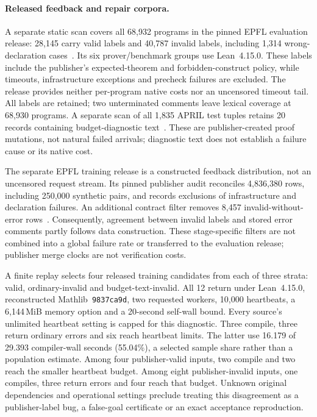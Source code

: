 \documentclass[10pt,twocolumn]{article}
\begin{document}
\paragraph{Released feedback and repair corpora.}
A separate static scan covers all 68,932 programs in the pinned EPFL
evaluation release: 28,145 carry valid labels and 40,787 invalid labels,
including 1,314 wrong-declaration cases~\cite{epflEvaluation}.
Its six prover/benchmark groups use Lean~4.15.0. These labels include the
publisher's expected-theorem and forbidden-construct policy, while timeouts,
infrastructure exceptions and precheck failures are excluded. The release
provides neither per-program native costs nor an uncensored timeout tail.
All labels are retained; two unterminated comments leave lexical coverage
at 68,930 programs. A separate scan of all 1,835 APRIL test tuples retains
20 records containing budget-diagnostic text~\cite{aprilDataset}.
These are publisher-created proof mutations, not natural failed arrivals;
diagnostic text does not establish a failure cause or its native cost.

The separate EPFL training release is a constructed feedback distribution,
not an uncensored request stream. Its pinned publisher audit reconciles
4,836,380 rows, including 250,000 synthetic pairs, and records exclusions
of infrastructure and declaration failures. An additional contract filter
removes 8,457 invalid-without-error rows~\cite{epflTrainingAudit}.
Consequently, agreement between invalid labels and stored error comments
partly follows data construction. These stage-specific filters are not
combined into a global failure rate or transferred to the evaluation release;
publisher merge clocks are not verification costs.

A finite replay selects four released training candidates from each of three
strata: valid, ordinary-invalid and budget-text-invalid. All 12 return under
Lean~4.15.0, reconstructed Mathlib~\texttt{9837ca9d}, two requested workers,
10,000 heartbeats, a 6,144\,MiB memory option and a 20-second self-wall bound.
Every source's unlimited heartbeat setting is capped for this diagnostic.
Three compile, three return ordinary errors and six reach heartbeat limits.
The latter use 16.179 of 29.393 compiler-wall seconds (55.04\%), a selected
sample share rather than a population estimate.
Among four publisher-valid inputs, two compile and two reach the smaller
heartbeat budget. Among eight publisher-invalid inputs, one compiles, three
return errors and four reach that budget. Unknown original dependencies and
operational settings preclude treating this disagreement as a publisher-label
bug, a false-goal certificate or an exact acceptance reproduction.
\end{document}
